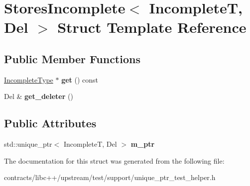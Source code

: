 \hypertarget{struct_stores_incomplete}{}\section{Stores\+Incomplete$<$ IncompleteT, Del $>$ Struct Template Reference}
\label{struct_stores_incomplete}
\subsection*{Public Member Functions}
\begin{DoxyCompactItemize}
\item 
\mbox{\label{struct_stores_incomplete_a6b3164ca0c883b2d720f15aa75c69591}} 
\mbox{\hyperlink{struct_incomplete_type}{Incomplete\+Type}} $\ast$ {\bfseries get} () const
\item 
\mbox{\label{struct_stores_incomplete_aab41a097f4fcb333b22e147831b5509f}} 
Del \& {\bfseries get\+\_\+deleter} ()
\end{DoxyCompactItemize}
\subsection*{Public Attributes}
\begin{DoxyCompactItemize}
\item 
\mbox{\label{struct_stores_incomplete_aa6bbe72d3ca1d25652d9fe53ff8ebdc5}} 
std\+::unique\+\_\+ptr$<$ IncompleteT, Del $>$ {\bfseries m\+\_\+ptr}
\end{DoxyCompactItemize}


The documentation for this struct was generated from the following file\+:\begin{DoxyCompactItemize}
\item 
contracts/libc++/upstream/test/support/unique\+\_\+ptr\+\_\+test\+\_\+helper.\+h\end{DoxyCompactItemize}
